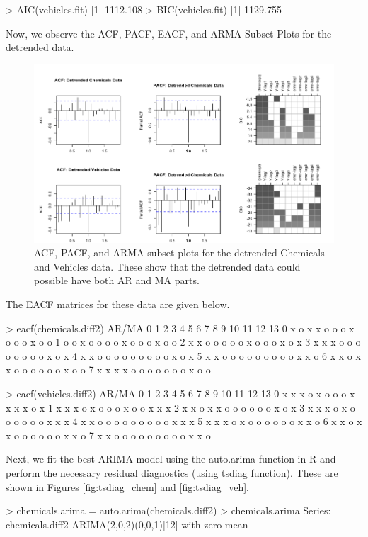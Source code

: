 \begin{enumerate}[label=(\roman*)]
\begin{block}
> AIC(vehicles.fit)
[1] 1112.108
> BIC(vehicles.fit)
[1] 1129.755
\end{block}
\normalsize Now, we observe the ACF, PACF, EACF, and ARMA Subset Plots for the detrended data.
\begin{figure}[!htb]
    \centering
    \includegraphics[width=\linewidth]{Images/P3/ACFs_Detrended.png}
    \caption[ACF, PACF, and ARMA subset plots for the detrended Chemicals and Vehicles data.]{ACF, PACF, and ARMA subset plots for the detrended Chemicals and Vehicles data. These show that the detrended data could possible have both AR and MA parts.}
    \label{fig:acf_det}
\end{figure}
The EACF matrices for these data are given below.
\small\begin{block}
> eacf(chemicals.diff2)
AR/MA
  0 1 2 3 4 5 6 7 8 9 10 11 12 13
0 x o x x o o o x o o o  x  o  o 
1 o o x o o o o x o o o  x  o  o 
2 x x o o o o o x o o o  x  o  x 
3 x x x o o o o o o o o  x  o  x 
4 x x o o o o o o o o o  x  o  x 
5 x x o o o o o o o o o  x  x  o 
6 x x o x x o o o o o o  x  o  o 
7 x x x x o o o o o o o  x  o  o 

> eacf(vehicles.diff2)
AR/MA
  0 1 2 3 4 5 6 7 8 9 10 11 12 13
0 x x x o x o o o x x x  x  o  x 
1 x x x o x o o o x o o  x  x  x 
2 x x o x x o o o o o o  x  o  x 
3 x x x o x o o o o o o  x  x  x 
4 x x o o o o o o o o o  x  x  x 
5 x x x o x o o o o o o  x  x  o 
6 x x o x x o o o o o o  x  x  o 
7 x x o o o o o o o o o  x  x  o 
\end{block}
\normalsize Next, we fit the best ARIMA model using the auto.arima function in R and perform the necessary residual diagnostics (using tsdiag function). These are shown in Figures \ref{fig:tsdiag_chem} and \ref{fig:tsdiag_veh}.
\small\begin{block}
> chemicals.arima = auto.arima(chemicals.diff2)
> chemicals.arima
Series: chemicals.diff2 
ARIMA(2,0,2)(0,0,1)[12] with zero mean 


\end{block}
\end{enumerate}

